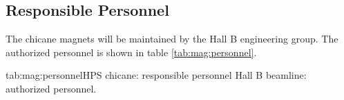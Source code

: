 \begin{safetyen}{10}{15}
\subsection{Responsible  Personnel} 
\end{safetyen}
The chicane magnets will be maintained by the Hall B engineering group. The authorized personnel is shown in table \ref{tab:mag:personnel}.
\begin{namestab}{tab:mag:personnel}{HPS chicane:  responsible personnel}{%
       Hall B beamline: authorized personnel.}
\end{namestab}

